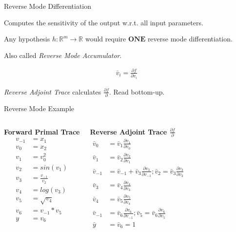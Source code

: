 \documentclass{beamer}
\begin{document}
\begin{frame}{Reverse Mode Differentiation}

Computes the sensitivity of the output w.r.t. all input parameters.

Any hypothesis $h: \mathbb{R}^m \to \mathbb{R}$ would require $\textbf{ONE}$ reverse
mode differentiation.

Also called \textit{Reverse Mode Accumulator}.

\begin{align}
\bar{v}_i = \frac{\partial f}{\partial v_i} \tag{adjoint of a variable}
\end{align}

\textit{Reverse Adjoint Trace} calculates $\frac{\partial f}{\partial}$. Read bottom-up.

\end{frame}

\begin{frame}{Reverse Mode Example}
\begin{columns}[T,onlytextwidth]
      \textbf{Forward Primal Trace}
      \begin{align*}
		v_{-1} &= x_1 \\
		v_0 &= x_2 \\
		v_1 &= v_0^2 \\
		v_2 &= sin(v_1) \\
		v_3 &= \frac{v_{-1}}{v_2} \\
		v_4 &= log(v_3) \\
		v_5 &= \sqrt{v_4} \\
		v_6 &= v_{-1} * v_5 \\
		y &= v_6
      \end{align*}

      \textbf{Reverse Adjoint Trace $\frac{\partial f}{\partial}$}
	  \begin{align*}
		\bar{v}_0 &= \bar{v}_1 \frac{\partial v_1}{\partial v_0} \\
		\bar{v}_1 &= \bar{v}_2 \frac{\partial v_2}{\partial v_1} \\
		\bar{v}_{-1} &= \bar{v}_{-1} + \bar{v}_3\frac{\partial v_3}{\partial v_{-1}}; \bar{v}_2 = \bar{v}_3\frac{\partial v_3}{\partial v_2} \\ 
		\bar{v}_3 &= \bar{v}_4 \frac{\partial v_4}{\partial v_3} \\
		\bar{v}_4 &= \bar{v}_5 \frac{\partial v_5}{\partial v_4} \\
		\bar{v}_{-1} &= \bar{v}_6 \frac{\partial v_6}{\partial v_{-1}}; \bar{v}_5 = \bar{v}_6 \frac{\partial v_6}{\partial v_5} \\
		\bar{y} &= \bar{v}_6 = 1
	  \end{align*}
\end{columns}
\end{frame}
\end{document}
